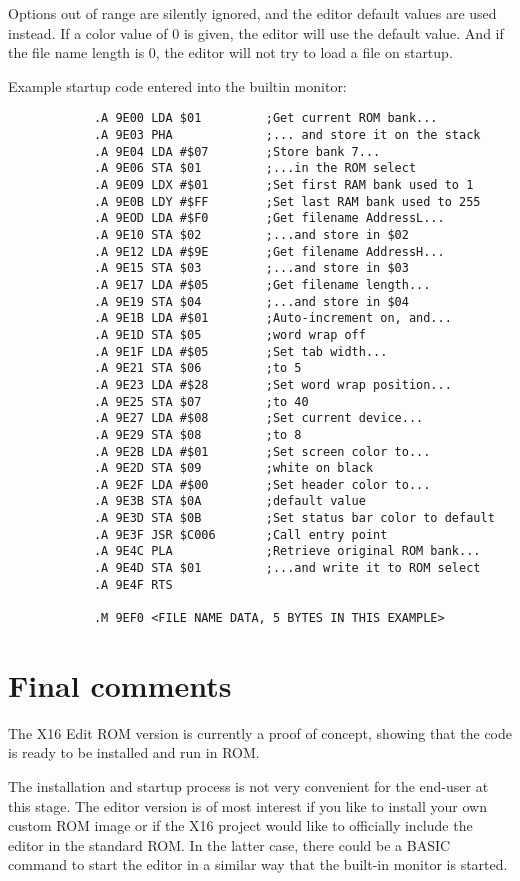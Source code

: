 \documentclass{article}
\begin{document}
        \vspace{1em}Options out of range are silently ignored, and the editor default values are used instead. If a color value of 0 is given, the
        editor will use the default value. And if the file name length is 0, the editor will not try to load a file on startup.

        Example startup code entered into the builtin monitor:

        \begin{verbatim}
            .A 9E00 LDA $01         ;Get current ROM bank...
            .A 9E03 PHA             ;... and store it on the stack
            .A 9E04 LDA #$07        ;Store bank 7...
            .A 9E06 STA $01         ;...in the ROM select
            .A 9E09 LDX #$01        ;Set first RAM bank used to 1
            .A 9E0B LDY #$FF        ;Set last RAM bank used to 255
            .A 9EOD LDA #$F0        ;Get filename AddressL...
            .A 9E10 STA $02         ;...and store in $02
            .A 9E12 LDA #$9E        ;Get filename AddressH...
            .A 9E15 STA $03         ;...and store in $03
            .A 9E17 LDA #$05        ;Get filename length...
            .A 9E19 STA $04         ;...and store in $04
            .A 9E1B LDA #$01        ;Auto-increment on, and...
            .A 9E1D STA $05         ;word wrap off
            .A 9E1F LDA #$05        ;Set tab width...
            .A 9E21 STA $06         ;to 5
            .A 9E23 LDA #$28        ;Set word wrap position...
            .A 9E25 STA $07         ;to 40
            .A 9E27 LDA #$08        ;Set current device...
            .A 9E29 STA $08         ;to 8
            .A 9E2B LDA #$01        ;Set screen color to...
            .A 9E2D STA $09         ;white on black
            .A 9E2F LDA #$00        ;Set header color to...
            .A 9E3B STA $0A         ;default value
            .A 9E3D STA $0B         ;Set status bar color to default
            .A 9E3F JSR $C006       ;Call entry point
            .A 9E4C PLA             ;Retrieve original ROM bank...
            .A 9E4D STA $01         ;...and write it to ROM select
            .A 9E4F RTS

            .M 9EF0 <FILE NAME DATA, 5 BYTES IN THIS EXAMPLE>
        \end{verbatim} 


\section{Final comments}

    The X16 Edit ROM version is currently a proof of concept, showing that the code is ready to be installed and run in ROM.
    
    The installation and startup process is not very convenient for the end-user at this stage. The editor version is of most
    interest if you like to install your own custom ROM image or if the X16 project would like to officially include the
    editor in the standard ROM. In the latter case, there could be a BASIC command to start the editor in a similar way
    that the built-in monitor is started.
\end{document}
